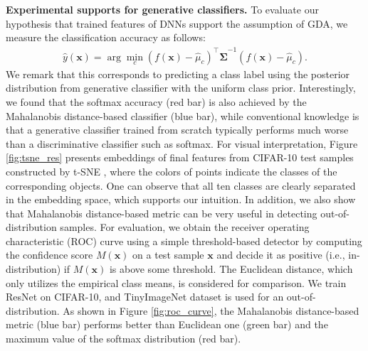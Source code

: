 \documentclass{article}
\begin{document}
{\bf Experimental supports for generative classifiers.}
To evaluate our hypothesis that trained features of DNNs support the assumption of GDA, 
we measure the classification accuracy as follows: \begin{align} \label{eq:classification}
\widehat y (\mathbf{x}) = \arg \min_c \left( f(\mathbf{x}) - {\widehat \mu}_{c} \right)^\top \mathbf{\widehat \Sigma}^{-1} \left(f(\mathbf{x}) - {\widehat \mu}_{c}\right).
\end{align}
We remark that this corresponds to predicting a class label using the posterior distribution from generative classifier with the uniform class prior.
Interestingly, 
we found that the softmax accuracy (red bar) is also achieved by the Mahalanobis distance-based classifier (blue bar),
while conventional knowledge is
that a generative classifier trained from scratch typically performs much worse than
a discriminative classifier such as softmax. For visual interpretation,
Figure \ref{fig:tsne_res} presents embeddings of final features from CIFAR-10 test samples constructed by t-SNE \citep{maaten2008visualizing}, where the colors of points indicate the classes of the corresponding objects.
One can observe that all ten classes are clearly separated in the embedding space, 
which supports our intuition.
In addition,
we also show that Mahalanobis distance-based metric can be very useful in detecting out-of-distribution samples.
For evaluation, we obtain the receiver operating characteristic (ROC) curve using a simple threshold-based detector
by computing the confidence score $M(\mathbf{x})$ on a test sample $\mathbf{x}$ and decide it as positive (i.e., in-distribution) if $M(\mathbf{x})$ is above some threshold.
The Euclidean distance, which only utilizes the empirical class means, is considered for comparison.
We train ResNet on CIFAR-10, and TinyImageNet dataset \citep{deng2009imagenet} is used for an out-of-distribution.
As shown in Figure \ref{fig:roc_curve}, 
the Mahalanobis distance-based metric (blue bar) performs better than Euclidean one (green bar) and the maximum value of the softmax distribution (red bar).
\end{document}
